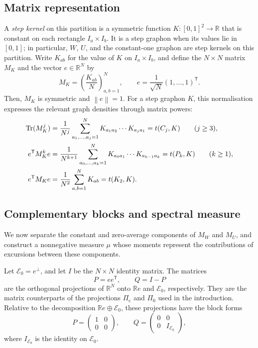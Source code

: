 \documentclass[11pt]{article}
\theoremstyle{remark}
\numberwithin{equation}{section}
\newcommand{\R}{\mathbb R}
\newcommand{\norm}[1]{\left\lVert #1\right\rVert}
\newcommand{\Tr}{\operatorname{Tr}}
\newcommand{\dens}[2]{t(#1,#2)}
\newcommand{\edens}[1]{t(K_{2},#1)}
\begin{document}
\subsection{Matrix representation}
\label{subsec:step-matrices}

A \emph{step kernel} on this partition is a symmetric function $K\colon[0,1]^2\to\R$ that is constant on each rectangle $I_a\times I_b$.
It is a step graphon when its values lie in $[0,1]$; in particular, $W$, $U$, and the constant-one graphon are step kernels on this partition.
Write $K_{ab}$ for the value of $K$ on $I_a\times I_b$, and define the $N\times N$ matrix
$M_K$ and the vector $e\in\R^N$ by
\begin{equation*}
  M_K=\left(\frac{K_{ab}}N\right)_{a,b=1}^N,
  \qquad
  e=\frac1{\sqrt N}(1,\ldots,1)^{\mathsf T}.
\end{equation*}
Then, $M_K$ is symmetric and $\norm e=1$. For a step graphon $K$, this normalisation expresses the relevant graph densities through matrix powers:
\begin{align}
  \Tr(M_K^j)
  &=\frac1{N^j}\sum_{a_1,\ldots,a_j=1}^N
    K_{a_1a_2}\cdots K_{a_ja_1}
   =\dens{C_j}K \qquad (j\ge3),\notag\\
  e^{\mathsf T}M_K^ke
  &=\frac1{N^{k+1}}\sum_{a_0,\ldots,a_k=1}^N
    K_{a_0a_1}\cdots K_{a_{k-1}a_k}
   =\dens{P_k}K \qquad (k\ge1),\notag\\
  e^{\mathsf T}M_Ke
  &=\frac1{N^2}\sum_{a,b=1}^NK_{ab}
  =\edens K. \label{eq:edge-matrix}
\end{align}

\subsection{Complementary blocks and spectral measure}
\label{subsec:spectral-setup}

We now separate the constant and zero-average components of $M_W$ and $M_U$, and construct a nonnegative measure $\mu$ whose moments represent the contributions of excursions between these components.

Let $\mathcal E_0=e^\perp$, and let $I$ be the $N\times N$ identity
matrix. The matrices
\[
  P=ee^{\mathsf T},
  \qquad
  Q=I-P
\]
are the orthogonal projections of $\R^N$ onto $\R e$ and $\mathcal E_0$,
respectively. They are the matrix counterparts of the projections
$\Pi_{\mathrm c}$ and $\Pi_0$ used in the introduction.
Relative to the decomposition $\R e\oplus\mathcal E_0$, these projections have the block forms
\begin{equation}\label{eq:block-PQ}
  P=\begin{pmatrix}1&0\\0&0\end{pmatrix},
  \qquad
  Q=\begin{pmatrix}0&0\\0&I_{\mathcal E_0}\end{pmatrix},
\end{equation}
where $I_{\mathcal E_0}$ is the identity on $\mathcal E_0$.
\end{document}
